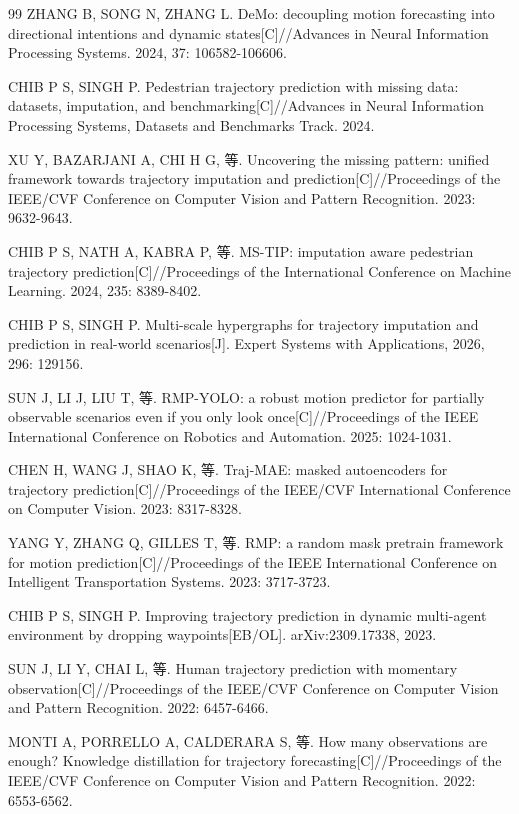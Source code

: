 \begin{thebibliography}{99}
ZHANG B, SONG N, ZHANG L. DeMo: decoupling motion forecasting into directional intentions and dynamic states[C]//Advances in Neural Information Processing Systems. 2024, 37: 106582-106606.

CHIB P S, SINGH P. Pedestrian trajectory prediction with missing data: datasets, imputation, and benchmarking[C]//Advances in Neural Information Processing Systems, Datasets and Benchmarks Track. 2024.

XU Y, BAZARJANI A, CHI H G, 等. Uncovering the missing pattern: unified framework towards trajectory imputation and prediction[C]//Proceedings of the IEEE/CVF Conference on Computer Vision and Pattern Recognition. 2023: 9632-9643.

CHIB P S, NATH A, KABRA P, 等. MS-TIP: imputation aware pedestrian trajectory prediction[C]//Proceedings of the International Conference on Machine Learning. 2024, 235: 8389-8402.

CHIB P S, SINGH P. Multi-scale hypergraphs for trajectory imputation and prediction in real-world scenarios[J]. Expert Systems with Applications, 2026, 296: 129156.

SUN J, LI J, LIU T, 等. RMP-YOLO: a robust motion predictor for partially observable scenarios even if you only look once[C]//Proceedings of the IEEE International Conference on Robotics and Automation. 2025: 1024-1031.

CHEN H, WANG J, SHAO K, 等. Traj-MAE: masked autoencoders for trajectory prediction[C]//Proceedings of the IEEE/CVF International Conference on Computer Vision. 2023: 8317-8328.

YANG Y, ZHANG Q, GILLES T, 等. RMP: a random mask pretrain framework for motion prediction[C]//Proceedings of the IEEE International Conference on Intelligent Transportation Systems. 2023: 3717-3723.

CHIB P S, SINGH P. Improving trajectory prediction in dynamic multi-agent environment by dropping waypoints[EB/OL]. arXiv:2309.17338, 2023.

SUN J, LI Y, CHAI L, 等. Human trajectory prediction with momentary observation[C]//Proceedings of the IEEE/CVF Conference on Computer Vision and Pattern Recognition. 2022: 6457-6466.

MONTI A, PORRELLO A, CALDERARA S, 等. How many observations are enough? Knowledge distillation for trajectory forecasting[C]//Proceedings of the IEEE/CVF Conference on Computer Vision and Pattern Recognition. 2022: 6553-6562.


\end{thebibliography}
